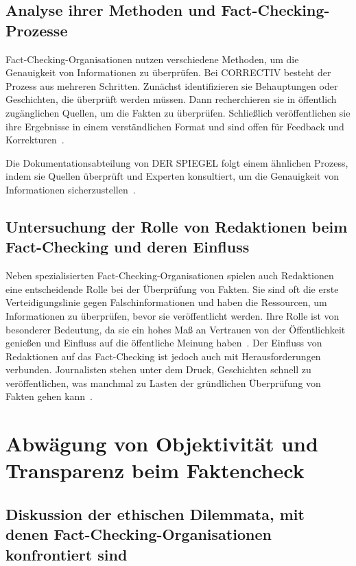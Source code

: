 \documentclass[a4paper,listof=totoc,bibliography=totoc]{scrartcl}
\begin{document}
\subsection{Analyse ihrer Methoden und Fact-Checking-Prozesse}

Fact-Checking-Organisationen nutzen verschiedene Methoden, um die Genauigkeit von Informationen
zu überprüfen. Bei CORRECTIV besteht der Prozess aus mehreren Schritten. Zunächst identifizieren 
sie Behauptungen oder Geschichten, die überprüft werden müssen. Dann recherchieren sie in öffentlich 
zugänglichen Quellen, um die Fakten zu überprüfen. Schließlich veröffentlichen sie ihre Ergebnisse 
in einem verständlichen Format und sind offen für Feedback und Korrekturen~\cite{fengler2015}. 

Die Dokumentationsabteilung von DER SPIEGEL folgt einem ähnlichen Prozess, indem sie Quellen überprüft 
und Experten konsultiert, um die Genauigkeit von Informationen sicherzustellen~\cite{benz2017}.

\subsection{Untersuchung der Rolle von Redaktionen beim Fact-Checking und deren Einfluss}

Neben spezialisierten Fact-Checking-Organisationen spielen auch Redaktionen eine entscheidende Rolle 
bei der Überprüfung von Fakten. Sie sind oft die erste Verteidigungslinie gegen Falschinformationen 
und haben die Ressourcen, um Informationen zu überprüfen, bevor sie veröffentlicht werden. Ihre Rolle 
ist von besonderer Bedeutung, da sie ein hohes Maß an Vertrauen von der Öffentlichkeit genießen und 
Einfluss auf die öffentliche Meinung haben~\cite{graves2018}. 
Der Einfluss von Redaktionen auf das Fact-Checking ist jedoch auch mit Herausforderungen verbunden. 
Journalisten stehen unter dem Druck, Geschichten schnell zu veröffentlichen, was manchmal zu Lasten 
der gründlichen Überprüfung von Fakten gehen kann~\cite{nyhan2010}. 

\section{Abwägung von Objektivität und Transparenz beim Faktencheck}

\subsection{Diskussion der ethischen Dilemmata, mit denen Fact-Checking-Organisationen konfrontiert sind}
\end{document}
